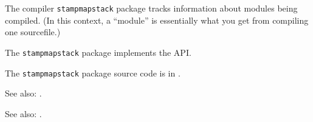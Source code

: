 
The compiler {\tt stampmapstack} package tracks information about modules being 
compiled.  (In this context, a ``module'' is essentially what you get from 
compiling one sourcefile.)

The {\tt stampmapstack} package implements the  API.

The {\tt stampmapstack} package source code is in .

See also: .

See also: .

